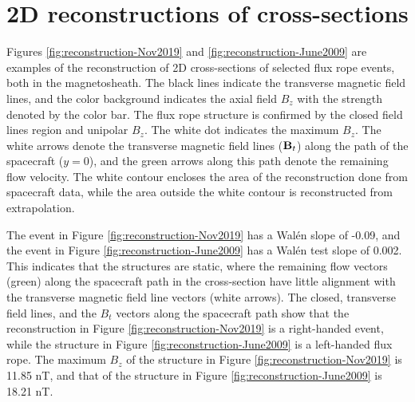 \section{2D reconstructions of cross-sections}
Figures \ref{fig:reconstruction-Nov2019} and \ref{fig:reconstruction-June2009} are examples of the reconstruction of 2D cross-sections of selected flux rope events, both in the magnetosheath. The black lines indicate the transverse magnetic field lines, and the color background indicates the axial field $B_z$ with the strength denoted by the color bar. The flux rope structure is confirmed by the closed field lines region and unipolar $B_z$. The white dot indicates the maximum $B_z$. The white arrows denote the transverse magnetic field lines ($\mathbf{B}_t$) along the path of the spacecraft ($y=0$), and the green arrows along this path denote the remaining flow velocity. The white contour encloses the area of the reconstruction done from spacecraft data, while the area outside the white contour is reconstructed from extrapolation.

The event in Figure \ref{fig:reconstruction-Nov2019} has a Wal\'en slope of -0.09, and the event in Figure \ref{fig:reconstruction-June2009} has a Wal\'en test slope of 0.002. This indicates that the structures are static, where the remaining flow vectors (green) along the spacecraft path in the cross-section have little alignment with the transverse magnetic field line vectors (white arrows). The closed, transverse field lines, and the $B_t$ vectors along the spacecraft path show that the reconstruction in Figure \ref{fig:reconstruction-Nov2019} is a right-handed event, while the structure in Figure \ref{fig:reconstruction-June2009} is a left-handed flux rope. The maximum $B_z$ of the structure in Figure \ref{fig:reconstruction-Nov2019} is 11.85 nT, and that of the structure in Figure \ref{fig:reconstruction-June2009} is 18.21 nT.

